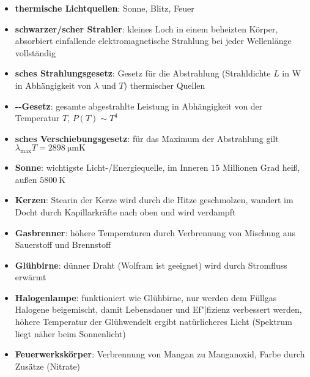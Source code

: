 \begin{itemize}
    \item
    \textbf{thermische Lichtquellen}:
    Sonne, Blitz, Feuer

    \item
    \textbf{schwarzer/scher Strahler}:
    kleines Loch in einem beheizten Körper,
    absorbiert einfallende elektromagnetische Strahlung bei jeder Wellenlänge
    vollständig

    \item
    \textbf{sches Strahlungsgesetz}:
    Gesetz für die Abstrahlung (Strahldichte $L$ in $\si{\watt}$ in Abhängigkeit
    von $\lambda$ und $T$) thermischer Quellen

    \item
    \textbf{--Gesetz}:
    gesamte abgestrahlte Leistung in Abhängigkeit von der Temperatur $T$,
    $P(T) \sim T^4$

    \item
    \textbf{sches Verschiebungsgesetz}:
    für das Maximum der Abstrahlung gilt \\
    $\lambda_{\text{max}} T = \SI{2898}{\micro\meter\kelvin}$

    \item
    \textbf{Sonne}:
    wichtigste Licht-/Energiequelle,
    im Inneren $15$ Millionen Grad heiß, außen $\SI{5800}{\kelvin}$

    \item
    \textbf{Kerzen}:
    Stearin der Kerze wird durch die Hitze geschmolzen, wandert im Docht
    durch Kapillarkräfte nach oben und wird verdampft

    \item
    \textbf{Gasbrenner}:
    höhere Temperaturen durch Verbrennung von Mischung aus Sauerstoff und
    Brennstoff

    \item
    \textbf{Glühbirne}:
    dünner Draht (Wolfram ist geeignet) wird durch Stromfluss erwärmt

    \item
    \textbf{Halogenlampe}:
    funktioniert wie Glühbirne, nur werden dem Füllgas Halogene beigemischt,
    damit Lebensdauer und Ef"|fizienz verbessert werden,
    höhere Temperatur der Glühwendelt ergibt natürlicheres Licht
    (Spektrum liegt näher beim Sonnenlicht)

    \item
    \textbf{Feuerwerkskörper}:
    Verbrennung von Mangan zu Manganoxid,
    Farbe durch Zusätze (Nitrate)
\end{itemize}
